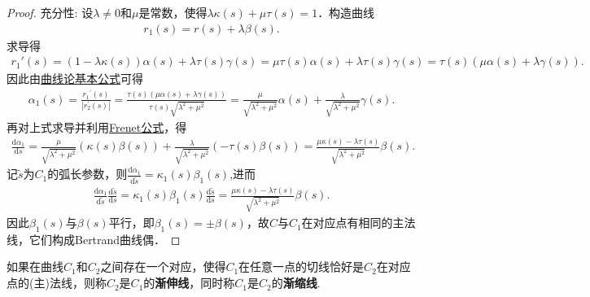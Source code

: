 \documentclass[../../main.tex]{subfiles}%
\begin{document}
\begin{proof}
{\heiti 充分性:} 设$\lambda\neq0$和$\mu$是常数，使得$\lambda\kappa(s)+\mu\tau(s)=1$．构造曲线
\begin{align}
r_1(s)=r(s)+\lambda\beta(s).
\end{align}
求导得
\begin{align*}
r_1' \left( s \right) =(1-\lambda \kappa \left( s \right) )\alpha \left( s \right) +\lambda \tau \left( s \right) \gamma \left( s \right) =\mu \tau \left( s \right) \alpha \left( s \right) +\lambda \tau \left( s \right) \gamma \left( s \right) =\tau \left( s \right) (\mu \alpha \left( s \right) +\lambda \gamma \left( s \right) ).
\end{align*}
因此由\hyperref[theorem:曲线论基本公式]{曲线论基本公式}可得
\begin{align*}
\alpha _1(s)=\frac{{r_1}^{\prime}\left( s \right)}{\left| r_{2}^{\prime}\left( s \right) \right|}=\frac{\tau \left( s \right) \left( \mu \alpha \left( s \right) +\lambda \gamma \left( s \right) \right)}{\tau \left( s \right) \sqrt{\lambda ^2+\mu ^2}}=\frac{\mu}{\sqrt{\lambda ^2+\mu ^2}}\alpha (s)+\frac{\lambda}{\sqrt{\lambda ^2+\mu ^2}}\gamma (s).
\end{align*}
再对上式求导并利用\hyperref[theorem:微分几何-Frenet公式]{Frenet公式}，得
\begin{align*}
\frac{\mathrm{d}\alpha _1}{\mathrm{d}s}=\frac{\mu}{\sqrt{\lambda ^2+\mu ^2}}(\kappa \left( s \right) \beta \left( s \right) )+\frac{\lambda}{\sqrt{\lambda ^2+\mu ^2}}(-\tau \left( s \right) \beta \left( s \right) )=\frac{\mu \kappa \left( s \right) -\lambda \tau \left( s \right)}{\sqrt{\lambda ^2+\mu ^2}}\beta \left( s \right) .
\end{align*}
记$\tilde{s}$为$C_1$的弧长参数，则$\frac{\mathrm{d}\alpha _1}{\mathrm{d}\tilde{s}}=\kappa _1\left( s \right) \beta _1\left( s \right) $,进而
\begin{align*}
\frac{\mathrm{d}\alpha _1}{\mathrm{d}\tilde{s}}\frac{\mathrm{d}\tilde{s}}{\mathrm{d}s}=\kappa _1\left( s \right) \beta _1\left( s \right) \frac{\mathrm{d}\tilde{s}}{\mathrm{d}s}=\frac{\mu \kappa \left( s \right) -\lambda \tau \left( s \right)}{\sqrt{\lambda ^2+\mu ^2}}\beta \left( s \right) .
\end{align*}
因此$\beta_1(s)$与$\beta(s)$平行，即$\beta_1(s)=\pm\beta(s)$，故$C$与$C_1$在对应点有相同的主法线，它们构成Bertrand曲线偶．

\end{proof}

\begin{definition}
如果在曲线$C_1$和$C_2$之间存在一个对应，使得$C_1$在任意一点的切线恰好是$C_2$在对应点的(主)法线，则称$C_2$是$C_1$的\textbf{渐伸线}，同时称$C_1$是$C_2$的\textbf{渐缩线}.
\end{definition}
\end{document}
